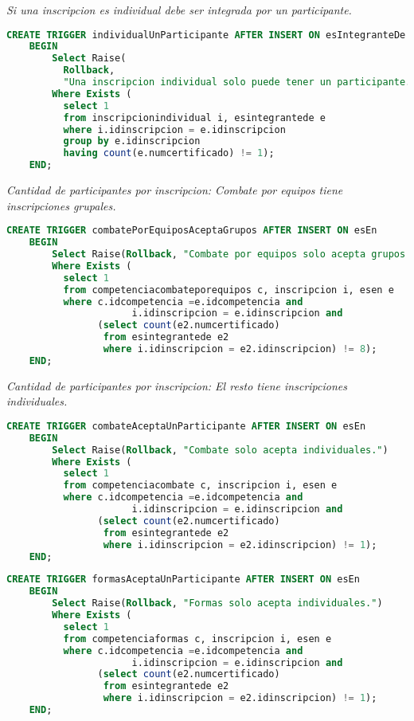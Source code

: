 \emph{Si una inscripcion es individual debe ser integrada por un participante.}

\begin{lstlisting}[language=SQL]
CREATE TRIGGER individualUnParticipante AFTER INSERT ON esIntegranteDe
    BEGIN
        Select Raise(
          Rollback,
          "Una inscripcion individual solo puede tener un participante.")
        Where Exists (
          select 1
          from inscripcionindividual i, esintegrantede e
          where i.idinscripcion = e.idinscripcion
          group by e.idinscripcion
          having count(e.numcertificado) != 1);
    END;
\end{lstlisting}

\emph{Cantidad de participantes por inscripcion: Combate por equipos tiene inscripciones grupales.}

\begin{lstlisting}[language=SQL]
CREATE TRIGGER combatePorEquiposAceptaGrupos AFTER INSERT ON esEn
    BEGIN
        Select Raise(Rollback, "Combate por equipos solo acepta grupos.")
        Where Exists (
          select 1
          from competenciacombateporequipos c, inscripcion i, esen e
          where c.idcompetencia =e.idcompetencia and
                      i.idinscripcion = e.idinscripcion and
                (select count(e2.numcertificado)
                 from esintegrantede e2
                 where i.idinscripcion = e2.idinscripcion) != 8);
    END;
\end{lstlisting}

\emph{Cantidad de participantes por inscripcion: El resto tiene inscripciones individuales.}

\begin{lstlisting}[language=SQL]
CREATE TRIGGER combateAceptaUnParticipante AFTER INSERT ON esEn
    BEGIN
        Select Raise(Rollback, "Combate solo acepta individuales.")
        Where Exists (
          select 1
          from competenciacombate c, inscripcion i, esen e
          where c.idcompetencia =e.idcompetencia and
                      i.idinscripcion = e.idinscripcion and
                (select count(e2.numcertificado)
                 from esintegrantede e2
                 where i.idinscripcion = e2.idinscripcion) != 1);
    END;
\end{lstlisting}

\begin{lstlisting}[language=SQL]
CREATE TRIGGER formasAceptaUnParticipante AFTER INSERT ON esEn
    BEGIN
        Select Raise(Rollback, "Formas solo acepta individuales.")
        Where Exists (
          select 1
          from competenciaformas c, inscripcion i, esen e
          where c.idcompetencia =e.idcompetencia and
                      i.idinscripcion = e.idinscripcion and
                (select count(e2.numcertificado)
                 from esintegrantede e2
                 where i.idinscripcion = e2.idinscripcion) != 1);
    END;
\end{lstlisting}

